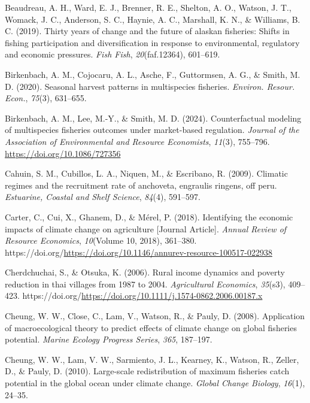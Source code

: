 \documentclass[
  11pt,
]{article}
\newlength{\cslhangindent}
\newenvironment{CSLReferences}[2] %
 {\begin{list}{}{%
  \setlength{\itemindent}{0pt}
  \setlength{\leftmargin}{0pt}
  \setlength{\parsep}{0pt}
  \ifodd #1
   \setlength{\leftmargin}{\cslhangindent}
   \setlength{\itemindent}{-1\cslhangindent}
  \fi
  \setlength{\itemsep}{#2\baselineskip}}}
 {\end{list}}
\begin{document}
\begin{CSLReferences}{1}{0}
Beaudreau, A. H., Ward, E. J., Brenner, R. E., Shelton, A. O., Watson, J. T., Womack, J. C., Anderson, S. C., Haynie, A. C., Marshall, K. N., \& Williams, B. C. (2019). Thirty years of change and the future of alaskan fisheries: Shifts in fishing participation and diversification in response to environmental, regulatory and economic pressures. \emph{Fish Fish}, \emph{20}(faf.12364), 601--619.

Birkenbach, A. M., Cojocaru, A. L., Asche, F., Guttormsen, A. G., \& Smith, M. D. (2020). Seasonal harvest patterns in multispecies fisheries. \emph{Environ. Resour. Econ.}, \emph{75}(3), 631--655.

Birkenbach, A. M., Lee, M.-Y., \& Smith, M. D. (2024). Counterfactual modeling of multispecies fisheries outcomes under market-based regulation. \emph{Journal of the Association of Environmental and Resource Economists}, \emph{11}(3), 755--796. \url{https://doi.org/10.1086/727356}

Cahuin, S. M., Cubillos, L. A., Niquen, M., \& Escribano, R. (2009). Climatic regimes and the recruitment rate of anchoveta, engraulis ringens, off peru. \emph{Estuarine, Coastal and Shelf Science}, \emph{84}(4), 591--597.

Carter, C., Cui, X., Ghanem, D., \& Mérel, P. (2018). Identifying the economic impacts of climate change on agriculture {[}Journal Article{]}. \emph{Annual Review of Resource Economics}, \emph{10}(Volume 10, 2018), 361--380. https://doi.org/\url{https://doi.org/10.1146/annurev-resource-100517-022938}

Cherdchuchai, S., \& Otsuka, K. (2006). Rural income dynamics and poverty reduction in thai villages from 1987 to 2004. \emph{Agricultural Economics}, \emph{35}(s3), 409--423. https://doi.org/\url{https://doi.org/10.1111/j.1574-0862.2006.00187.x}

Cheung, W. W., Close, C., Lam, V., Watson, R., \& Pauly, D. (2008). Application of macroecological theory to predict effects of climate change on global fisheries potential. \emph{Marine Ecology Progress Series}, \emph{365}, 187--197.

Cheung, W. W., Lam, V. W., Sarmiento, J. L., Kearney, K., Watson, R., Zeller, D., \& Pauly, D. (2010). Large-scale redistribution of maximum fisheries catch potential in the global ocean under climate change. \emph{Global Change Biology}, \emph{16}(1), 24--35.


\end{CSLReferences}
\end{document}
